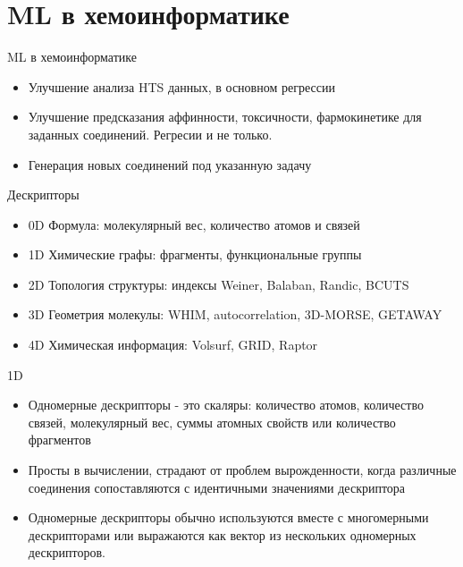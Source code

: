 \begin{frame}[plain]

\end{frame}

\section{ML в  хемоинформатике}
\begin{frame}{ML в  хемоинформатике}
    \begin{itemize}
            \item Улучшение анализа HTS данных, в основном регрессии
            \item Улучшение предсказания  аффинности, токсичности, фармокинетике для заданных соединений. Регресии и не только.
            \item Генерация новых  соединений под указанную задачу
        \end{itemize}
\end{frame}

\begin{frame}{Дескрипторы}
    \begin{itemize}
        \item 0D Формула: молекулярный вес, количество атомов и связей
        \item 1D Химические графы: фрагменты, функциональные группы 
        \item 2D Топология структуры: индексы  Weiner, Balaban, Randic, BCUTS
        \item 3D Геометрия молекулы:  WHIM, autocorrelation, 3D-MORSE, GETAWAY
        \item 4D Химическая информация:  Volsurf, GRID, Raptor
        \end{itemize}
\end{frame}


\begin{frame}{1D}
    \begin{itemize}
        \item Одномерные дескрипторы - это скаляры:  количество атомов, количество связей, молекулярный вес, суммы атомных свойств или количество фрагментов
        \item Просты в вычислении, страдают от проблем вырожденности, когда различные соединения сопоставляются с идентичными значениями дескриптора
        \item Одномерные дескрипторы обычно используются вместе с многомерными дескрипторами или выражаются как вектор из нескольких одномерных дескрипторов. 
     \end{itemize}
\end{frame}

